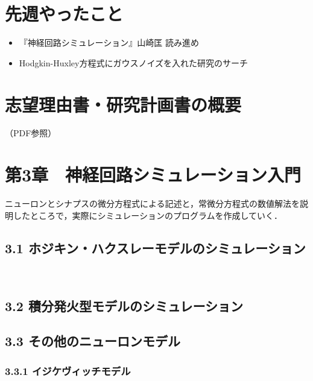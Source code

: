 \documentclass[dvipdfmx, A4j, twocolumn, 10.5pt]{jsarticle}
\begin{document}


\section{先週やったこと}
\begin{itemize}
 \item 『神経回路シミュレーション』山崎匡 読み進め
 \item Hodgkin-Huxley方程式にガウスノイズを入れた研究のサーチ

\end{itemize}
\section{志望理由書・研究計画書の概要}
（PDF参照）


\section*{第3章　神経回路シミュレーション入門}

ニューロンとシナプスの微分方程式による記述と，常微分方程式の数値解法を説明したところで，実際にシミュレーションのプログラムを作成していく．


\subsection*{3.1 ホジキン・ハクスレーモデルのシミュレーション}
　

\subsection*{3.2 積分発火型モデルのシミュレーション}
\subsection*{3.3 その他のニューロンモデル}
\subsubsection*{3.3.1 イジケヴィッチモデル}
\end{document}
